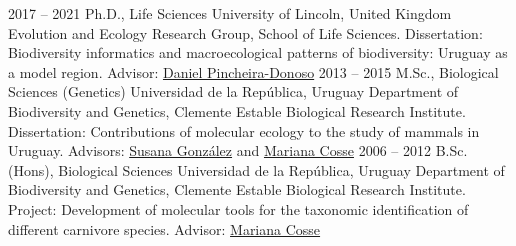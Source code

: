 \documentclass[9pt]{developercv} %
\begin{document}



\begin{entrylist}
	\entry
		{2017 -- 2021}
		{Ph.D., Life Sciences}
		{University of Lincoln, United Kingdom}
		{Evolution and Ecology Research Group, School of Life Sciences. Dissertation: Biodiversity informatics and macroecological patterns of biodiversity: Uruguay as a model region. Advisor: \href{http://selectiondynamics.weebly.com/daniel-pincheira-donoso.html}{Daniel Pincheira-Donoso}}
	\entry
		{2013 -- 2015}
		{M.Sc., Biological Sciences (Genetics)}
		{Universidad de la Rep\'{u}blica, Uruguay}
		{Department of Biodiversity and Genetics, Clemente Estable Biological Research Institute. Dissertation: Contributions of molecular ecology to the study of mammals in Uruguay. Advisors: \href{https://scholar.google.com.uy/citations?user=FSrtqaMAAAAJ&hl=en}{Susana González} and \href{https://scholar.google.com/citations?user=uWh1ONQAAAAJ&hl=es}{Mariana Cosse}}
	\entry
		{2006 -- 2012}
		{B.Sc. (Hons), Biological Sciences}
		{Universidad de la Rep\'{u}blica, Uruguay}
		{Department of Biodiversity and Genetics, Clemente Estable Biological Research Institute. Project: Development of molecular tools for the taxonomic identification of different carnivore species. Advisor: \href{https://scholar.google.com/citations?user=uWh1ONQAAAAJ&hl=es}{Mariana Cosse}}
\end{entrylist}
\end{document}
